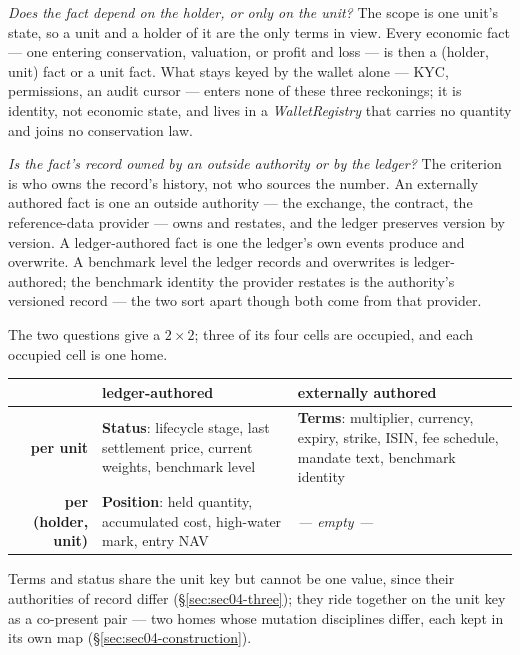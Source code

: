 \emph{Does the fact depend on the holder, or only on the unit?} The scope is one unit's
state, so a unit and a holder of it are the only terms in view. Every economic fact ---
one entering conservation, valuation, or profit and loss --- is then a (holder, unit)
fact or a unit fact. What stays keyed by the wallet alone --- KYC, permissions, an audit
cursor --- enters none of these three reckonings; it is identity, not economic state, and
lives in a \emph{WalletRegistry} that carries no quantity and joins no conservation law.

\emph{Is the fact's record owned by an outside authority or by the ledger?} The criterion
is who owns the record's history, not who sources the number. An externally authored fact
is one an outside authority --- the exchange, the contract, the reference-data provider
--- owns and restates, and the ledger preserves version by version. A ledger-authored
fact is one the ledger's own events produce and overwrite. A benchmark level the ledger
records and overwrites is ledger-authored; the benchmark identity the provider restates is
the authority's versioned record --- the two sort apart though both come from that
provider.

The two questions give a $2\times2$; three of its four cells are occupied, and each
occupied cell is one home.

\begin{center}
\begin{tabular}{@{}r p{} p{}@{}}
\toprule
 & \textbf{ledger-authored} & \textbf{externally authored} \\
\midrule
\textbf{per unit} & \textbf{Status}: lifecycle stage, last settlement price, current
weights, benchmark level & \textbf{Terms}: multiplier, currency, expiry, strike, ISIN,
fee schedule, mandate text, benchmark identity \\
\addlinespace
\textbf{per (holder, unit)} & \textbf{Position}: held quantity, accumulated cost,
high-water mark, entry NAV & \textit{--- empty ---} \\
\bottomrule
\end{tabular}
\end{center}

Terms and status share the unit key but cannot be one value, since their authorities of
record differ (\S\ref{sec:sec04-three}); they ride together on the unit key as a
co-present pair --- two homes whose mutation disciplines differ, each kept in its own map
(\S\ref{sec:sec04-construction}).

